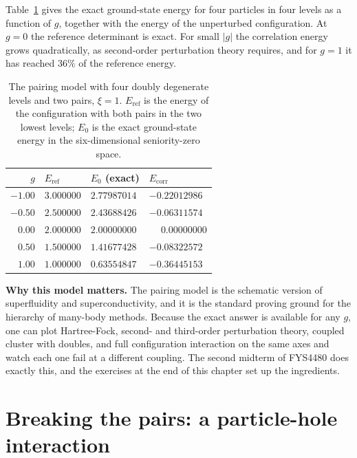 Table~\ref{tab:pairing} gives the exact ground-state energy for four particles
in four levels as a function of $g$, together with the energy of the
unperturbed configuration.  At $g=0$ the reference determinant is exact.  For
small $|g|$ the correlation energy grows quadratically, as second-order
perturbation theory requires, and for $g=1$ it has reached $36\%$ of the
reference energy.

\begin{table}[h]
\centering
\renewcommand{\arraystretch}{1.25}
\setlength{\tabcolsep}{12pt}
\begin{tabular}{rlll}
\toprule
$g$ & $E_{\mathrm{ref}}$ & $E_0$ (exact) & $E_{\mathrm{corr}}$\\
\midrule
$-1.00$ & $3.000000$ & $2.77987014$ & $-0.22012986$\\
$-0.50$ & $2.500000$ & $2.43688426$ & $-0.06311574$\\
$0.00$  & $2.000000$ & $2.00000000$ & $\phantom{-}0.00000000$\\
$0.50$  & $1.500000$ & $1.41677428$ & $-0.08322572$\\
$1.00$  & $1.000000$ & $0.63554847$ & $-0.36445153$\\
\bottomrule
\end{tabular}
\caption{The pairing model with four doubly degenerate levels and two pairs,
$\xi=1$.  $E_{\mathrm{ref}}$ is the energy of the configuration with both
pairs in the two lowest levels; $E_0$ is the exact ground-state energy in the
six-dimensional seniority-zero space.}
\label{tab:pairing}
\end{table}

\begin{notebox}
\textbf{Why this model matters.} The pairing model is the schematic version
of superfluidity and superconductivity, and it is the standard proving ground
for the hierarchy of many-body methods.  Because the exact answer is
available for any $g$, one can plot Hartree-Fock, second- and third-order
perturbation theory, coupled cluster with doubles, and full configuration
interaction on the same axes and watch each one fail at a different coupling.
The second midterm of FYS4480 does exactly this, and the exercises at the end
of this chapter set up the ingredients.
\end{notebox}

\section{Breaking the pairs: a particle-hole interaction}
\label{sec:pairingph}

